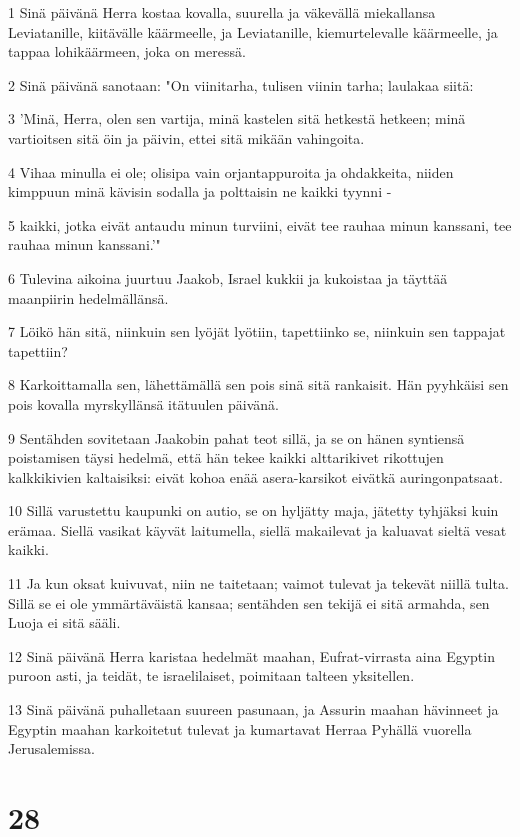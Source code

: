 \par 1 Sinä päivänä Herra kostaa kovalla, suurella ja väkevällä miekallansa Leviatanille, kiitävälle käärmeelle, ja Leviatanille, kiemurtelevalle käärmeelle, ja tappaa lohikäärmeen, joka on meressä.
\par 2 Sinä päivänä sanotaan: "On viinitarha, tulisen viinin tarha; laulakaa siitä:
\par 3 'Minä, Herra, olen sen vartija, minä kastelen sitä hetkestä hetkeen; minä vartioitsen sitä öin ja päivin, ettei sitä mikään vahingoita.
\par 4 Vihaa minulla ei ole; olisipa vain orjantappuroita ja ohdakkeita, niiden kimppuun minä kävisin sodalla ja polttaisin ne kaikki tyynni -
\par 5 kaikki, jotka eivät antaudu minun turviini, eivät tee rauhaa minun kanssani, tee rauhaa minun kanssani.'"
\par 6 Tulevina aikoina juurtuu Jaakob, Israel kukkii ja kukoistaa ja täyttää maanpiirin hedelmällänsä.
\par 7 Löikö hän sitä, niinkuin sen lyöjät lyötiin, tapettiinko se, niinkuin sen tappajat tapettiin?
\par 8 Karkoittamalla sen, lähettämällä sen pois sinä sitä rankaisit. Hän pyyhkäisi sen pois kovalla myrskyllänsä itätuulen päivänä.
\par 9 Sentähden sovitetaan Jaakobin pahat teot sillä, ja se on hänen syntiensä poistamisen täysi hedelmä, että hän tekee kaikki alttarikivet rikottujen kalkkikivien kaltaisiksi: eivät kohoa enää asera-karsikot eivätkä auringonpatsaat.
\par 10 Sillä varustettu kaupunki on autio, se on hyljätty maja, jätetty tyhjäksi kuin erämaa. Siellä vasikat käyvät laitumella, siellä makailevat ja kaluavat sieltä vesat kaikki.
\par 11 Ja kun oksat kuivuvat, niin ne taitetaan; vaimot tulevat ja tekevät niillä tulta. Sillä se ei ole ymmärtäväistä kansaa; sentähden sen tekijä ei sitä armahda, sen Luoja ei sitä sääli.
\par 12 Sinä päivänä Herra karistaa hedelmät maahan, Eufrat-virrasta aina Egyptin puroon asti, ja teidät, te israelilaiset, poimitaan talteen yksitellen.
\par 13 Sinä päivänä puhalletaan suureen pasunaan, ja Assurin maahan hävinneet ja Egyptin maahan karkoitetut tulevat ja kumartavat Herraa Pyhällä vuorella Jerusalemissa.

\chapter{28}

